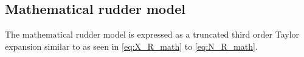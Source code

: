 \subsection{Mathematical rudder model}
\label{sec:mathematical_rudder_model}
The mathematical rudder model is expressed as a truncated third order Taylor expansion similar to \citet{abkowitz_ship_1964} as seen in \autoref{eq:X_R_math} to \autoref{eq:N_R_math}.
\begin{equation}
    \label{eq:X_R_math}
    
\end{equation}
%
\begin{equation}
    \label{eq:Y_R_math}
    
\end{equation}
%
\begin{equation}
    \label{eq:N_R_math}
    
\end{equation}